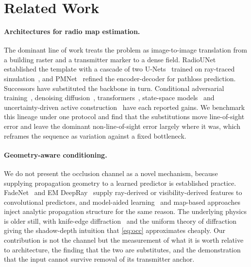 \section{Related Work}
\label{sec:related}

\paragraph{Architectures for radio map estimation.}
The dominant line of work treats the problem as image-to-image translation from a
building raster and a transmitter marker to a dense field.
RadioUNet~\cite{levie2021radiounet} established the template with a cascade of two
U-Nets~\cite{ronneberger2015unet} trained on ray-traced
simulation~\cite{yapar2023dataset}, and PMNet~\cite{lee2024pmnet} refined the
encoder-decoder for pathloss prediction. Successors have substituted the backbone
in turn. Conditional adversarial training~\cite{zhang2023rmegan}, denoising
diffusion~\cite{wang2025radiodiff, jia2025rmdm},
transformers~\cite{li2025rmtransformer, fang2025radioformer}, state-space
models~\cite{jia2025radiomamba} and uncertainty-driven active
construction~\cite{lu2025uram} have each reported gains. We benchmark this lineage
under one protocol and find that the substitutions move line-of-sight error and
leave the dominant non-line-of-sight error largely where it was, which reframes the
sequence as variation against a fixed bottleneck.

\paragraph{Geometry-aware conditioning.}
We do not present the occlusion channel as a novel mechanism, because supplying
propagation geometry to a learned predictor is established practice. FadeNet~\cite{ratnam2021fadenet} and EM
DeepRay~\cite{bakirtzis2022emdeepray} supply ray-derived or visibility-derived
features to convolutional predictors, and model-aided
learning~\cite{thrane2020modelaided} and map-based
approaches~\cite{dempsey2025mapbased} inject analytic propagation structure for the
same reason. The underlying physics is older still, with knife-edge
diffraction~\cite{deygout1966knifeedge} and the uniform theory of
diffraction~\cite{kouyoumjian1974utd} giving the shadow-depth intuition that
\cref{eq:occ} approximates cheaply. Our contribution is not the channel but the
measurement of what it is worth relative to architecture, the finding that the two
are substitutes, and the demonstration that the input cannot survive removal of its
transmitter anchor.


